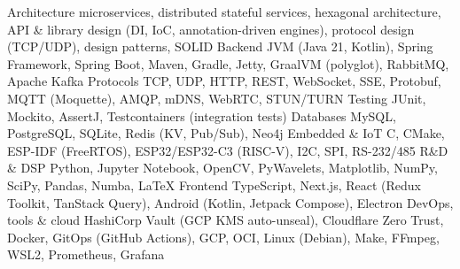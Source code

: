 
\newcommand{\TextRodo}{%
  I hereby give consent for my personal data included in my application to be processed for the purposes of the
  recruitment process under the Regulation (EU) 2016/679 of the European Parliament and of the Council of 27 April 2016
  on the protection of natural persons with regard to the processing of personal data and on the free movement of such
  data, and repealing Directive 95/46/EC (General Data Protection Regulation).
}


\newcommand{\SkillsTitle}{Technologies \& skills}
\renewcommand{\SkillsList}{}
\AddSkillEntry
  {Architecture}
  {%
    microservices, distributed stateful services, hexagonal architecture, API \& library design (DI, IoC,
    annotation-driven engines), protocol design (TCP/UDP), design patterns, SOLID
  }
\AddSkillEntry
  {Backend}
  {%
    JVM (Java 21, Kotlin), Spring Framework, Spring Boot, Maven, Gradle, Jetty, GraalVM (polyglot), RabbitMQ, Apache
    Kafka
  }
\AddSkillEntry
  {Protocols}
  {TCP, UDP, HTTP, REST, WebSocket, SSE, Protobuf, MQTT (Moquette), AMQP, mDNS, WebRTC, STUN/TURN}
\AddSkillEntry
  {Testing}
  {JUnit, Mockito, AssertJ, Testcontainers (integration tests)}
\AddSkillEntry
  {Databases}
  {MySQL, PostgreSQL, SQLite, Redis (KV, Pub/Sub), Neo4j}
\AddSkillEntry
  {Embedded \& IoT}
  {C, CMake, ESP-IDF (FreeRTOS), ESP32/ESP32-C3 (RISC-V), I2C, SPI, RS-232/485}
\AddSkillEntry
  {R\&D \& DSP}
  {Python, Jupyter Notebook, OpenCV, PyWavelets, Matplotlib, NumPy, SciPy, Pandas, Numba, \LaTeX}
\AddSkillEntry
  {Frontend}
  {TypeScript, Next.js, React (Redux Toolkit, TanStack Query), Android (Kotlin, Jetpack Compose), Electron}
\AddSkillEntry
  {DevOps, tools \& cloud}
  {%
    HashiCorp Vault (GCP KMS auto-unseal), Cloudflare Zero Trust, Docker, GitOps (GitHub Actions), GCP, OCI, Linux
    (Debian), Make, FFmpeg, WSL2, Prometheus, Grafana
  }
